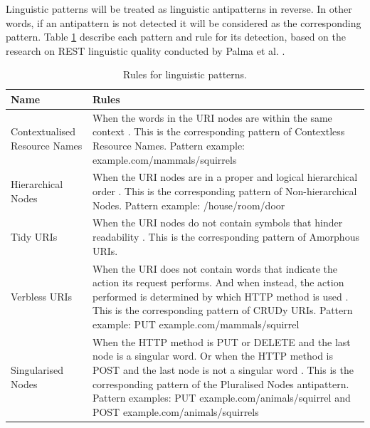 Linguistic patterns will be treated as linguistic antipatterns in reverse. In other words, if an antipattern is not detected it will be considered as the corresponding  pattern. Table \ref{tab:Rulesforlinguisticpatterns} describe each pattern and rule for its detection, based on the research on REST linguistic quality conducted by Palma et al. \cite{linguistic}.

\begin{center}
\begin{table}[!ht]
\small
\begin{tabular}{|p{30mm}|p{105mm}|}
\hline \textbf{Name} & \textbf{Rules} \\
\hline 
Contextualised Resource Names &
When the words in the URI nodes are within the same context \cite{linguistic}. This is the corresponding pattern of Contextless Resource Names. \newline Pattern example: 
example.com/mammals/squirrels\\ \hline
Hierarchical Nodes &
When the URI nodes are in a proper and logical hierarchical order \cite{linguistic}. This is the corresponding pattern of Non-hierarchical Nodes. \newline Pattern example: /house/room/door\\ \hline
Tidy URIs &
When the URI nodes do not contain symbols that hinder readability \cite{linguistic}. This is the corresponding pattern of Amorphous URIs.\\ \hline
Verbless URIs &
When the URI does not contain words that indicate the action its request performs. And when instead, the action performed is determined by which HTTP method is used \cite{linguistic}. This is the corresponding pattern of CRUDy URIs. \newline Pattern example: 
PUT example.com/mammals/squirrel\\ \hline
Singularised Nodes
&
When the HTTP method is PUT or DELETE and the last node is a singular word. Or when the HTTP method is POST and the last node is not a singular word \cite{linguistic}. This is the corresponding pattern of the Pluralised Nodes antipattern. \newline Pattern examples: PUT example.com/animals/squirrel and POST example.com/animals/squirrels\\ \hline
\end{tabular}
 \caption{Rules for linguistic patterns.}
 \label{tab:Rulesforlinguisticpatterns}
\end{table}
\end{center}


